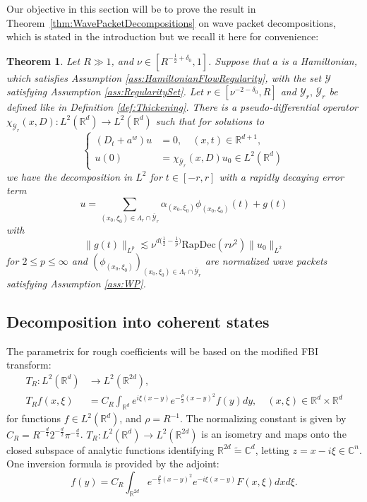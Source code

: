 \documentclass{amsart}
\newtheorem{theorem}{Theorem}[section]
\theoremstyle{definition}
\newcommand{\R}{\mathbb{R}}
\newcommand{\C}{\mathbb{C}}
\begin{document}
Our objective in this section will be to prove 
the result in Theorem~\ref{thm:WavePacketDecompositions} on wave packet decompositions, which is  stated in the introduction but we recall it here for convenience:
\begin{theorem}
Let $R \gg 1$, and $\nu \in [R^{-\frac{1}{2}+\delta_0},1]$. Suppose that $a$ is a Hamiltonian, which satisfies Assumption \ref{ass:HamiltonianFlowRegularity}, with the set $\mathcal{Y}$ satisfying Assumption \ref{ass:RegularitySet}. Let $r \in [\nu^{-2-\delta_0},R]$ and $\mathcal{Y}_r, \, \overline{\mathcal{Y}}_r$ be defined like in Definition \ref{def:Thickening}. 
There is a pseudo-differential operator $\chi_{\overline{\mathcal{Y}}_r}(x,D): L^2(\R^d) \to L^2(\R^d)$ such that for solutions to
\begin{equation*}
\left\{ \begin{array}{cl}
(D_t + a^w) u &= 0, \quad (x,t) \in \R^{d+1}, \\
u(0) &= \chi_{\overline{\mathcal{Y}}_r}(x,D) u_0 \in L^2(\R^d)
\end{array} \right.
\end{equation*}
we have the decomposition in $L^2$ for $t \in [-r,r]$ with a rapidly decaying error term
\begin{equation*}
u = \sum_{(x_0,\xi_0) \in \Lambda_r \cap \overline{\mathcal{Y}}_r} \alpha_{(x_0,\xi_0)} \phi_{(x_0,\xi_0)}(t) + g(t)
\end{equation*}
with 
\begin{equation*}
\| g(t) \|_{L^p} \lesssim \nu^{d \big( \frac12 - \frac1p \big)} \text{RapDec}(r \nu^2) \| u_0 \|_{L^2}
\end{equation*}
for $2 \leq p \leq \infty$ and $(\phi_{(x_0,\xi_0)})_{(x_0,\xi_0) \in \Lambda_r \cap \overline{\mathcal{Y}}_r}$ are normalized wave packets satisfying Assumption \ref{ass:WP}.
\end{theorem}

\subsection{Decomposition into coherent states}

The parametrix for rough coefficients will be based on the modified FBI transform:
\begin{equation}
\label{eq:RescaledPhaseSpaceTransform}
\begin{split}
T_R : L^2(\R^d) &\to L^2(\R^{2d}), \\ T_R f(x,\xi) &= C_R \int_{\R^d} e^{i \xi (x-y)} e^{-\frac{\rho}{2} (x-y)^2} f(y) dy, \quad (x,\xi) \in \R^d \times \R^d
\end{split}
\end{equation}
for functions $f \in L^2(\R^d)$, and $\rho = R^{-1}$. The normalizing constant is given by $C_R = R^{-\frac{d}{4}} 2^{-\frac{d}{2}} \pi^{-\frac{d}{4}}$. $T_R: L^2(\R^d) \to L^2(\R^{2d})$ is an isometry and maps onto the closed subspace of analytic functions identifying $\R^{2d} \tilde{=} \C^d$, letting $z = x - i \xi \in \C^n$. 
One inversion formula is provided by the adjoint:
\begin{equation*}
f(y) = C_R \int_{\R^{2d}} e^{-\frac{\rho}{2}(x-y)^2} e^{-i \xi (x-y)} F(x,\xi) dx d\xi.
\end{equation*}
\end{document}
